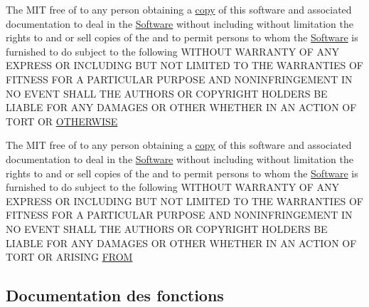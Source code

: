 \begin{DoxyCompactItemize}
The M\+I\+T free of to any person obtaining a \hyperlink{license_8txt_aff1d4c6b756ebf691fa44a0904f68658}{copy} of this software and associated documentation to deal in the \hyperlink{license_8txt_a22a1529885b3e9d66b0c72fe604fc3dc}{Software} without including without limitation the rights to and or sell copies of the and to permit persons to whom the \hyperlink{license_8txt_a22a1529885b3e9d66b0c72fe604fc3dc}{Software} is furnished to do subject to the following W\+I\+T\+H\+O\+U\+T W\+A\+R\+R\+A\+N\+T\+Y O\+F A\+N\+Y E\+X\+P\+R\+E\+S\+S O\+R I\+N\+C\+L\+U\+D\+I\+N\+G B\+U\+T N\+O\+T L\+I\+M\+I\+T\+E\+D T\+O T\+H\+E W\+A\+R\+R\+A\+N\+T\+I\+E\+S O\+F F\+I\+T\+N\+E\+S\+S F\+O\+R A P\+A\+R\+T\+I\+C\+U\+L\+A\+R P\+U\+R\+P\+O\+S\+E A\+N\+D N\+O\+N\+I\+N\+F\+R\+I\+N\+G\+E\+M\+E\+N\+T I\+N N\+O E\+V\+E\+N\+T S\+H\+A\+L\+L T\+H\+E A\+U\+T\+H\+O\+R\+S O\+R C\+O\+P\+Y\+R\+I\+G\+H\+T H\+O\+L\+D\+E\+R\+S B\+E L\+I\+A\+B\+L\+E F\+O\+R A\+N\+Y D\+A\+M\+A\+G\+E\+S O\+R O\+T\+H\+E\+R W\+H\+E\+T\+H\+E\+R I\+N A\+N A\+C\+T\+I\+O\+N O\+F T\+O\+R\+T O\+R \hyperlink{license_8txt_ae4c7c54aef6c135b4520f2237dbcf7c6}{O\+T\+H\+E\+R\+W\+I\+S\+E}
\item 
The M\+I\+T free of to any person obtaining a \hyperlink{license_8txt_aff1d4c6b756ebf691fa44a0904f68658}{copy} of this software and associated documentation to deal in the \hyperlink{license_8txt_a22a1529885b3e9d66b0c72fe604fc3dc}{Software} without including without limitation the rights to and or sell copies of the and to permit persons to whom the \hyperlink{license_8txt_a22a1529885b3e9d66b0c72fe604fc3dc}{Software} is furnished to do subject to the following W\+I\+T\+H\+O\+U\+T W\+A\+R\+R\+A\+N\+T\+Y O\+F A\+N\+Y E\+X\+P\+R\+E\+S\+S O\+R I\+N\+C\+L\+U\+D\+I\+N\+G B\+U\+T N\+O\+T L\+I\+M\+I\+T\+E\+D T\+O T\+H\+E W\+A\+R\+R\+A\+N\+T\+I\+E\+S O\+F F\+I\+T\+N\+E\+S\+S F\+O\+R A P\+A\+R\+T\+I\+C\+U\+L\+A\+R P\+U\+R\+P\+O\+S\+E A\+N\+D N\+O\+N\+I\+N\+F\+R\+I\+N\+G\+E\+M\+E\+N\+T I\+N N\+O E\+V\+E\+N\+T S\+H\+A\+L\+L T\+H\+E A\+U\+T\+H\+O\+R\+S O\+R C\+O\+P\+Y\+R\+I\+G\+H\+T H\+O\+L\+D\+E\+R\+S B\+E L\+I\+A\+B\+L\+E F\+O\+R A\+N\+Y D\+A\+M\+A\+G\+E\+S O\+R O\+T\+H\+E\+R W\+H\+E\+T\+H\+E\+R I\+N A\+N A\+C\+T\+I\+O\+N O\+F T\+O\+R\+T O\+R A\+R\+I\+S\+I\+N\+G \hyperlink{license_8txt_ac44d0f7742875ad0d1fc3a6de1ee0f7d}{F\+R\+O\+M}
\end{DoxyCompactItemize}


\subsection{Documentation des fonctions}
\hypertarget{license_8txt_abdb4f4971cf029244bb81834ee9b393d}{}

